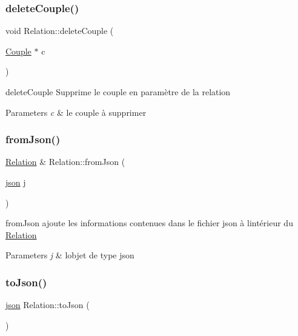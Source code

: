 \subsubsection{\texorpdfstring{delete\+Couple()}{deleteCouple()}}
{\footnotesize\ttfamily void Relation\+::delete\+Couple (\begin{DoxyParamCaption}\item[{\hyperlink{classCouple}{Couple} $\ast$}]{c }\end{DoxyParamCaption})}



delete\+Couple Supprime le couple en paramètre de la relation 


\begin{DoxyParams}{Parameters}
{\em c} & le couple à supprimer \\
\hline
\end{DoxyParams}
\mbox{\label{classRelation_acc9e6208d259046727368abb0bdbc09c}} 
\subsubsection{\texorpdfstring{from\+Json()}{fromJson()}}
{\footnotesize\ttfamily \hyperlink{classRelation}{Relation} \& Relation\+::from\+Json (\begin{DoxyParamCaption}\item[{\hyperlink{classnlohmann_1_1basic__json}{json}}]{j }\end{DoxyParamCaption})\hspace{0.3cm}{\ttfamily [static]}}



from\+Json ajoute les informations contenues dans le fichier json à l\textquotesingle{}intérieur du \hyperlink{classRelation}{Relation} 


\begin{DoxyParams}{Parameters}
{\em j} & l\textquotesingle{}objet de type json \\
\hline
\end{DoxyParams}
\mbox{\label{classRelation_abff3ec9eded734c0e851f7ba00c07fc3}} 
\subsubsection{\texorpdfstring{to\+Json()}{toJson()}}
{\footnotesize\ttfamily \hyperlink{classnlohmann_1_1basic__json}{json} Relation\+::to\+Json (\begin{DoxyParamCaption}{ }\end{DoxyParamCaption})}



